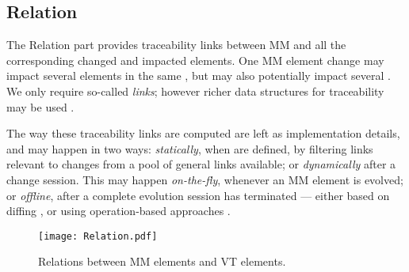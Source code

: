 \subsection{Relation}
\label{sec:Suggestion:Relation}

The \textsf{Relation} part provides traceability links between \textsf{MM}
and all the corresponding \textsf{changed} and \textsf{impacted} elements.
One \textsf{MM} element change
may impact several elements in the same \viewtype, but may also potentially
impact several \viewtypes. We only require so-called \emph{links}; however richer
data structures for traceability may be used \cite{Batot-Cabot-Gerard:2021}.

The way these traceability links are computed are left as implementation
details, and may happen in two ways: \emph{statically}, when \viewtypes are defined,
by filtering links relevant to changes from a pool of general links available;
or \emph{dynamically} after a change session. This may happen \emph{on-the-fly},
whenever an \textsf{MM} element is evolved; or \emph{offline},
after a complete evolution session has terminated --- either based on diffing 
\cite{Kehrer-Kelter-Taentzer:2011}, or using operation-based approaches \cite{J:Lippe-Oosterom:1992}.

\begin{figure}[t]
    \centering
    \texttt{[image: Relation.pdf]}
    \caption{\textsf{Relation}s between \textsf{MM} elements and \textsf{VT} elements.}
    \label{fig:Relation}
\end{figure}

